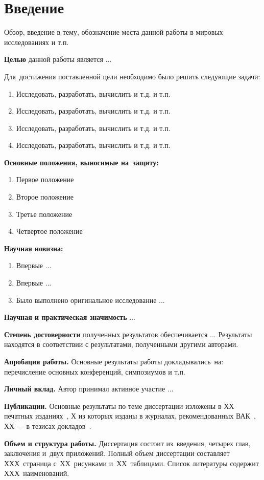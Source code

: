 \chapter*{Введение}
Обзор, введение в тему, обозначение места данной работы в мировых исследованиях и т.п.

\textbf{Целью} данной работы является ...

Для~достижения поставленной цели необходимо было решить следующие задачи:
\begin{enumerate}
 \item Исследовать, разработать, вычислить и т.д. и т.п.
 \item Исследовать, разработать, вычислить и т.д. и т.п.
 \item Исследовать, разработать, вычислить и т.д. и т.п.
 \item Исследовать, разработать, вычислить и т.д. и т.п.
\end{enumerate}

\textbf{Основные положения, выносимые на~защиту:}
\begin{enumerate}
 \item Первое положение

 \item Второе положение

 \item Третье положение

 \item Четвертое положение
\end{enumerate}

\textbf{Научная новизна:}
\begin{enumerate}
  \item Впервые ...
  \item Впервые ...
  \item Было выполнено оригинальное исследование ...
\end{enumerate}

\textbf{Научная и практическая значимость} ...

\textbf{Степень достоверности} полученных результатов обеспечивается ... Результаты находятся в соответствии с результатами, полученными другими авторами.

\textbf{Апробация работы.}
Основные результаты работы докладывались~на:
перечисление основных конференций, симпозиумов и т.п.

\textbf{Личный вклад.} Автор принимал активное участие ...

\textbf{Публикации.} Основные результаты по теме диссертации изложены в ХХ печатных изданиях~\cite{}, %
Х из которых изданы в журналах, рекомендованных ВАК~\cite{}, 
ХХ --- в тезисах докладов~\cite{}. %

{\bf Объем и структура работы.} Диссертация состоит из~введения, четырех глав, заключения и~двух приложений. Полный объем диссертации составляет ХХХ~страница с~ХХ~рисунками и~ХХ~таблицами. Список литературы содержит ХХХ~наименований.

\clearpage
